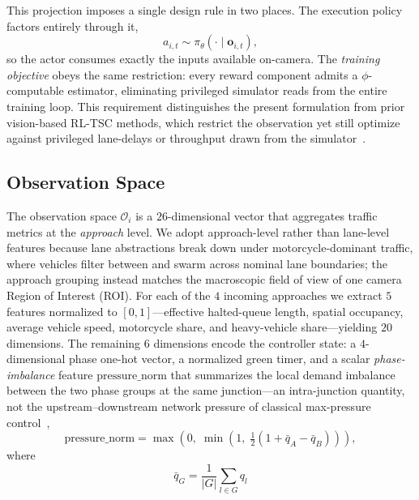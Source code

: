 This projection imposes a single design rule in two places. The execution policy
factors entirely through it,
\begin{equation}
  a_{i,t} \sim \pi_\theta\!\left(\cdot \mid \mathbf{o}_{i,t}\right),
  \label{eq:policy}
\end{equation}
so the actor consumes exactly the inputs available on-camera. The \emph{training
objective} obeys the same restriction: every reward component admits a
$\phi$-computable estimator, eliminating privileged simulator reads from the entire
training loop. This requirement distinguishes the present formulation from prior
vision-based RL-TSC methods, which restrict the observation yet still optimize against
privileged lane-delays or throughput drawn from the
simulator~\cite{dai2022_worldmodels, azfar2025_cosim}.

\subsection{Observation Space}
\label{sec:obs_space}
The observation space $\mathcal{O}_i$ is a $26$-dimensional vector that aggregates
traffic metrics at the \emph{approach} level. We adopt approach-level rather than
lane-level features because lane abstractions break down under motorcycle-dominant
traffic, where vehicles filter between and swarm across nominal lane boundaries; the
approach grouping instead matches the macroscopic field of view of one camera Region
of Interest (ROI). For each of the $4$ incoming approaches we extract $5$ features
normalized to $[0, 1]$---effective halted-queue length, spatial occupancy, average
vehicle speed, motorcycle share, and heavy-vehicle share---yielding $20$ dimensions.
The remaining $6$ dimensions encode the controller state: a $4$-dimensional phase
one-hot vector, a normalized green timer, and a scalar \emph{phase-imbalance}
feature $\mathrm{pressure\_norm}$ that summarizes the local demand imbalance
between the two phase groups at the same junction---an intra-junction
quantity, not the upstream--downstream network pressure of classical
max-pressure control~\cite{varaiya2013_maxpressure},
\begin{equation}
  \mathrm{pressure\_norm}
  = \max\!\left(0,\; \min\!\left(1,\; \tfrac{1}{2}\left(1 + \bar{q}_A - \bar{q}_B\right)\right)\right),
  \label{eq:pressure_norm}
\end{equation}
where
\begin{equation}
  \bar{q}_G = \frac{1}{|G|} \sum_{l \in G} q_l
  \label{eq:group_queue}
\end{equation}
